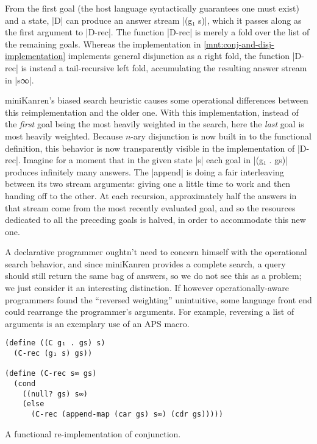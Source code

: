 \documentclass[sigplan,screen,draft,anonymous,review,natbib=false]{acmart}
\begin{document}
From the first goal (the host language syntactically guarantees one
must exist) and a state, \rackinline|D| can produce an answer stream
\rackinline|(g₁ s)|, which it passes along as the first argument to
\rackinline|D-rec|. The function \rackinline|D-rec| is merely a fold
over the list of the remaining goals. Whereas the implementation in
\cref{mnt:conj-and-disj-implementation} implements general disjunction
as a right fold, the function \rackinline|D-rec| is instead a
tail-recursive left fold, accumulating the resulting answer stream in
\rackinline|s∞|.

miniKanren's biased search heuristic causes some operational
differences between this reimplementation and the older one. With this
implementation, instead of the \emph{first} goal being the most
heavily weighted in the search, here the \emph{last} goal is most
heavily weighted. Because $n$-ary disjunction is now built in to the
functional definition, this behavior is now transparently visible in
the implementation of \rackinline|D-rec|. Imagine for a moment that in
the given state \rackinline|s| each goal in \rackinline|(g₁ . gs)|
produces infinitely many answers. The \rackinline|append| is doing a
fair interleaving between its two stream arguments: giving one a
little time to work and then handing off to the other. At each
recursion, approximately half the answers in that stream come from the
most recently evaluated goal, and so the resources dedicated to all
the preceding goals is halved, in order to accommodate this new one.

A declarative programmer oughtn't need to concern himself with the
operational search behavior, and since miniKanren provides a complete
search, a query should still return the same bag of answers, so we do
not see this as a problem; we just consider it an interesting
distinction. If however operationally-aware programmers found the
\enquote{reversed weighting} unintuitive, some language front end
could rearrange the programmer's arguments. For example, reversing a
list of arguments is an exemplary use of an APS macro.

\begin{listing}
  \begin{verbatim}
(define ((C g₁ . gs) s)
  (C-rec (g₁ s) gs))

(define (C-rec s∞ gs)
  (cond
    ((null? gs) s∞)
    (else
      (C-rec (append-map (car gs) s∞) (cdr gs)))))
  \end{verbatim}
  \caption{A functional re-implementation of conjunction.}
  \label{mnt:conj-re-implementation}
\end{listing}
\end{document}
